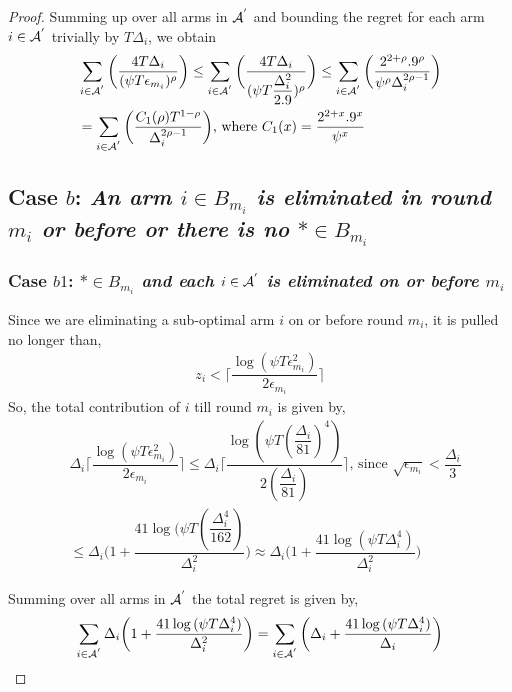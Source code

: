 \begin{proof}
Summing up over all arms in $\mathcal{A}^{'}$ and bounding the regret for each arm $i\in \mathcal{A}^{'}$ trivially by $T\Delta_{i}$, we obtain
   \begin{align*}
&\sum_{i\in \mathcal{A}^{'}}\bigg(\dfrac{4T\Delta_{i}}{(\psi T\epsilon_{m_{i}})^{\rho}}\bigg)
\leq\sum_{i\in \mathcal{A}^{'}}\bigg(\dfrac{4T\Delta_{i}}{(\psi T\dfrac{\Delta_{i}^{2}}{2.9})^{\rho}}\bigg)
\leq \sum_{i\in \mathcal{A}^{'}}\bigg(\dfrac{2^{2+\rho}.9^{\rho}}{\psi^{\rho}\Delta_{i}^{2\rho -1}}\bigg)\\   
& =\sum_{i\in \mathcal{A}^{'}}\bigg(\dfrac{C_{1}(\rho)T^{1-\rho}}{\Delta_{i}^{2\rho -1}}\bigg) \text{, where } C_1(x) = \frac{2^{2+x}.9^{x}}{\psi^{x}}
   \end{align*}

\subsection*{Case $b$: \textit{An arm ${i}\in B_{m_i}$ is eliminated in round $m_{i}$ or before or there is no $*\in B_{m_i}$}}

\subsubsection*{Case $b1$: \textit{${*}\in B_{m_{i}}$ and each ${i}\in \mathcal{A}^{'}$ is  eliminated on or before $m_{i}$ } }

Since we are eliminating a sub-optimal arm ${i}$ on or before round $m_{i}$, it is pulled no longer than, 
 \begin{align*}
 z_{i} < \bigg\lceil\dfrac{\log{(\psi T\epsilon_{m_{i}}^{2})}}{2\epsilon_{m_{i}}}\bigg\rceil
 \end{align*}
So, the total contribution of ${i}$  till round $m_{i}$ is given by, 
\begin{align*}
&\Delta_{i}\bigg\lceil\dfrac{\log{(\psi T\epsilon_{m_{i}}^{2})}}{2\epsilon_{m_{i}}}\bigg\rceil
\leq\Delta_{i}\bigg\lceil\dfrac{\log{(\psi T(\dfrac{\Delta_{i}}{81})^{4})}}{2(\dfrac{\Delta_{i}}{81})}\bigg\rceil \text{, since } \sqrt{\epsilon_{m_{i}}} < \dfrac{\Delta_{i}}{3}\\
&\leq\Delta_{i}\bigg(1+\dfrac{41\log{(\psi T(\dfrac{\Delta_{i}^{4}}{162})}}{\Delta_{i}^{2}}\bigg)
\approx\Delta_{i}\bigg(1+\dfrac{41\log{(\psi T\Delta_{i}^{4})}}{\Delta_{i}^{2}}\bigg)
\end{align*} 
 
Summing over all arms in $\mathcal{A}^{'}$ the total regret is given by, 
\begin{align*}
\sum_{i\in \mathcal{A}^{'}}\Delta_{i}\bigg(1+\dfrac{41\log{(\psi T\Delta_{i}^{4}})}{\Delta_{i}^{2}}\bigg) = \sum_{i\in \mathcal{A}^{'}}\bigg(\Delta_{i} +\dfrac{41\log{(\psi T\Delta_{i}^{4}})}{\Delta_{i}}\bigg)
\end{align*}


\end{proof}
